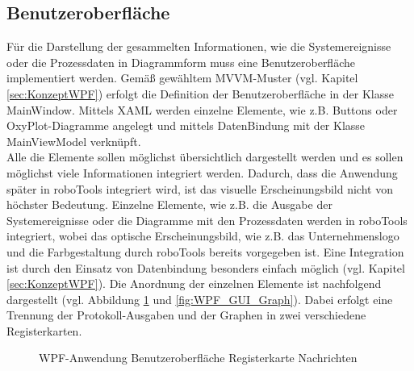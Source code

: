 \documentclass[ a4paper,
                oneside,
                toc=bibliography,
                toc=listof
                ]{scrbook}
\begin{document}
   	\subsection{Benutzeroberfläche}
   	Für die Darstellung der gesammelten Informationen, wie die Systemereignisse oder die Prozessdaten in Diagrammform muss eine Benutzeroberfläche implementiert werden. Gemäß gewähltem MVVM-Muster (vgl. Kapitel \ref{sec:KonzeptWPF}) erfolgt die Definition der Benutzeroberfläche in der Klasse MainWindow. Mittels XAML werden einzelne Elemente, wie z.B. Buttons oder OxyPlot-Diagramme angelegt und mittels DatenBindung mit der Klasse MainViewModel verknüpft.\\
   	Alle die Elemente sollen möglichst übersichtlich dargestellt werden und es sollen möglichst viele Informationen integriert werden. Dadurch, dass die Anwendung später in roboTools integriert wird, ist das visuelle Erscheinungsbild nicht von höchster Bedeutung. Einzelne Elemente, wie z.B. die Ausgabe der Systemereignisse oder die Diagramme mit den Prozessdaten werden in roboTools integriert, wobei das optische Erscheinungsbild, wie z.B. das Unternehmenslogo und die Farbgestaltung durch roboTools bereits vorgegeben ist. Eine Integration ist durch den Einsatz von Datenbindung besonders einfach möglich (vgl. Kapitel \ref{sec:KonzeptWPF}).
   	Die Anordnung der einzelnen Elemente ist nachfolgend dargestellt (vgl. Abbildung \ref{fig:WPF_GUI_Nachrichten} und \ref{fig:WPF_GUI_Graph}). Dabei erfolgt eine Trennung der Protokoll-Ausgaben und der Graphen in zwei verschiedene Registerkarten. \\
   	\begin{figure}
   		\caption{WPF-Anwendung Benutzeroberfläche Registerkarte Nachrichten}
   		\label{fig:WPF_GUI_Nachrichten}
   	\end{figure}
   	
\end{document}
